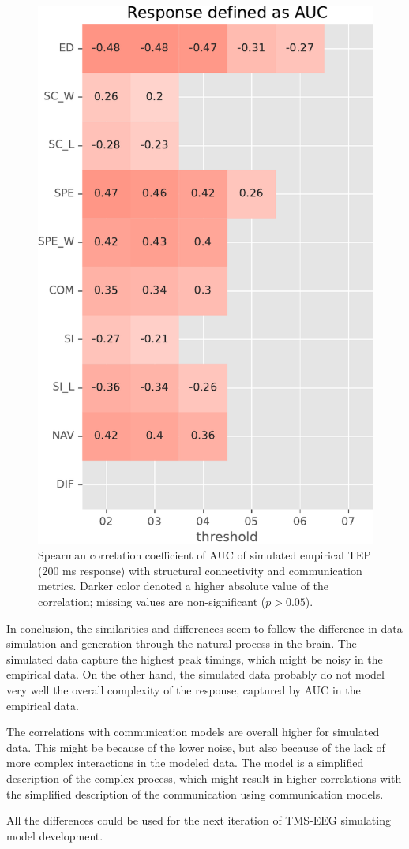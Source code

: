 \begin{figure}
    \centering
    \includegraphics[height=\textwidth]{images/nootebook_generated/pytepfit_results/simulated/200/not_over_threshold_nan/Response defined as AUC.pdf}
    \caption[TEPs AUC (200 ms) correlations (simulated data)]{Spearman correlation coefficient of AUC of simulated empirical TEP (200 ms response) with structural connectivity and communication metrics. Darker color denoted a higher absolute value of the correlation; missing values are non-significant ($p>0.05$).}
    \label{fig:tms_AUC_200_simulated}
\end{figure}

In conclusion, the similarities and differences seem to follow the difference in data simulation and generation through the natural process in the brain. The simulated data capture the highest peak timings, which might be noisy in the empirical data. On the other hand, the simulated data probably do not model very well the overall complexity of the response, captured by AUC in the empirical data. 

The correlations with communication models are overall higher for simulated data. This might be because of the lower noise, but also because of the lack of more complex interactions in the modeled data. The model is a simplified description of the complex process, which might result in higher correlations with the simplified description of the communication using communication models. 

All the differences could be used for the next iteration of TMS-EEG simulating model development.